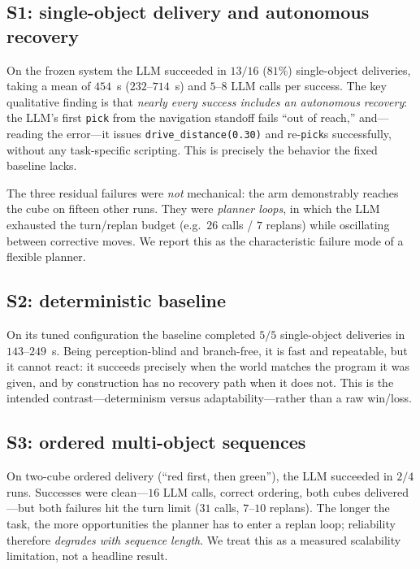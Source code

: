 \documentclass[conference]{IEEEtran}
\begin{document}
\subsection{S1: single-object delivery and autonomous recovery}
On the frozen system the LLM succeeded in $13/16$ ($81\%$) single-object
deliveries, taking a mean of $454$~s ($232$--$714$~s) and $5$--$8$ LLM calls per
success. The key qualitative finding is that \emph{nearly every success includes
an autonomous recovery}: the LLM's first \texttt{pick} from the navigation
standoff fails ``out of reach,'' and---reading the error---it issues
\texttt{drive\_distance(0.30)} and re-\texttt{pick}s successfully, without any
task-specific scripting. This is precisely the behavior the fixed baseline lacks.

The three residual failures were \emph{not} mechanical: the arm demonstrably
reaches the cube on fifteen other runs. They were \emph{planner loops}, in which
the LLM exhausted the turn/replan budget (e.g.\ $26$ calls / $7$ replans) while
oscillating between corrective moves. We report this as the characteristic failure
mode of a flexible planner.

\subsection{S2: deterministic baseline}
On its tuned configuration the baseline completed $5/5$ single-object deliveries
in $143$--$249$~s. Being perception-blind and branch-free, it is fast and
repeatable, but it cannot react: it succeeds precisely when the world matches the
program it was given, and by construction has no recovery path when it does not.
This is the intended contrast---determinism versus adaptability---rather than a
raw win/loss.

\subsection{S3: ordered multi-object sequences}
On two-cube ordered delivery (``red first, then green''), the LLM succeeded in
$2/4$ runs. Successes were clean---$16$ LLM calls, correct ordering, both cubes
delivered---but both failures hit the turn limit ($31$ calls, $7$--$10$ replans).
The longer the task, the more opportunities the planner has to enter a replan
loop; reliability therefore \emph{degrades with sequence length}. We treat this as
a measured scalability limitation, not a headline result.
\end{document}
